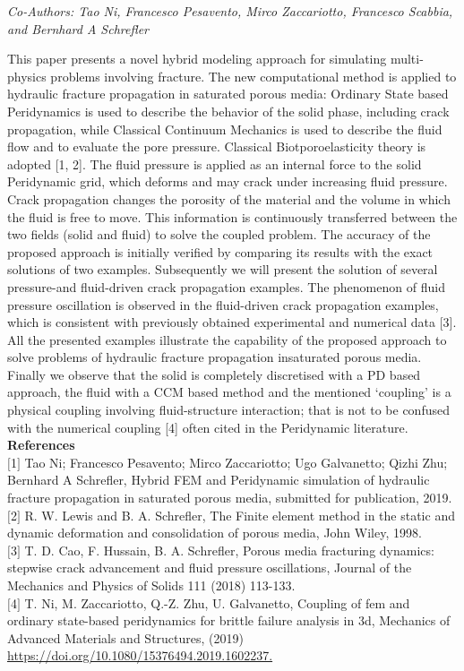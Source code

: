 \begin{center}
\textit{Co-Authors: Tao Ni, Francesco Pesavento, Mirco Zaccariotto, Francesco Scabbia, and Bernhard A Schrefler}
\end{center} 
This paper presents a novel hybrid modeling approach for simulating multi-physics problems involving fracture. The new computational method is applied to hydraulic fracture propagation in saturated porous media: Ordinary State based Peridynamics is used to describe the behavior of the solid phase, including crack propagation, while Classical Continuum Mechanics is used to describe the fluid flow and to evaluate the pore pressure. Classical Biotporoelasticity theory is adopted [1, 2]. The fluid pressure is applied as an internal force to the solid Peridynamic grid, which deforms and may crack under increasing fluid pressure. Crack propagation changes the porosity of the material and the volume in which the fluid is free to move. This information is continuously transferred between the two fields (solid and fluid) to solve the coupled problem. The accuracy of the proposed approach is initially verified by comparing its results with the exact solutions of two examples. Subsequently we will present the solution of several pressure-and fluid-driven crack propagation examples. The phenomenon of fluid pressure oscillation is observed in the fluid-driven crack propagation examples, which is consistent with previously obtained experimental and numerical data [3]. All the presented examples illustrate the capability of the proposed approach to solve problems of hydraulic fracture propagation insaturated porous media. Finally we observe that the solid is completely discretised with a PD based approach, the fluid with a CCM based method and the mentioned ‘coupling’ is a physical coupling involving fluid-structure interaction; that is not to be confused with the numerical coupling [4] often cited in the Peridynamic literature.\\

\noindent\textbf{References}\\
$[$1$]$ Tao Ni; Francesco Pesavento; Mirco Zaccariotto; Ugo Galvanetto; Qizhi Zhu; Bernhard A Schrefler, Hybrid FEM and Peridynamic simulation of hydraulic fracture propagation in saturated porous media, submitted for publication, 2019.\\
$[$2$]$ R. W. Lewis and B. A. Schrefler, The Finite element method in the static and dynamic deformation and consolidation of porous media, John Wiley, 1998.\\
$[$3$]$ T. D. Cao, F. Hussain, B. A. Schrefler, Porous media fracturing dynamics: stepwise crack advancement and fluid pressure oscillations, Journal of the Mechanics and Physics of Solids 111 (2018) 113-133.\\
$[$4$]$ T. Ni, M. Zaccariotto, Q.-Z. Zhu, U. Galvanetto, Coupling of fem and ordinary state-based peridynamics for brittle failure analysis in 3d, Mechanics of Advanced Materials and Structures, (2019) \url{https://doi.org/10.1080/15376494.2019.1602237.}
